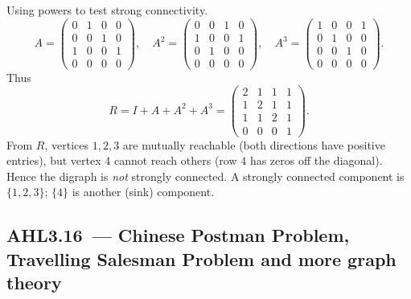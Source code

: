 \documentclass[11pt]{article}
\def\textbf#1{#1}%
\newcommand{\tocsubsection}[1]{\subsection{#1}}
\begin{document}
\begin{solution}
\textbf{Using powers to test strong connectivity.}
\[
A=\begin{pmatrix}
0&1&0&0\\
0&0&1&0\\
1&0&0&1\\
0&0&0&0
\end{pmatrix},\quad
A^2=\begin{pmatrix}
0&0&1&0\\
1&0&0&1\\
0&1&0&0\\
0&0&0&0
\end{pmatrix},\quad
A^3=\begin{pmatrix}
1&0&0&1\\
0&1&0&0\\
0&0&1&0\\
0&0&0&0
\end{pmatrix}.
\]
Thus
\[
R=I+A+A^2+A^3=
\begin{pmatrix}
2&1&1&1\\
1&2&1&1\\
1&1&2&1\\
0&0&0&1
\end{pmatrix}.
\]
From $R$, vertices $1,2,3$ are mutually reachable (both directions have positive entries), but vertex $4$ cannot reach others (row $4$ has zeros off the diagonal). Hence the digraph is \emph{not} strongly connected. A strongly connected component is $\{1,2,3\}$; $\{4\}$ is another (sink) component.
\end{solution}




\tocsubsection{AHL3.16 — Chinese Postman Problem, Travelling Salesman Problem and more graph theory}
\end{document}
